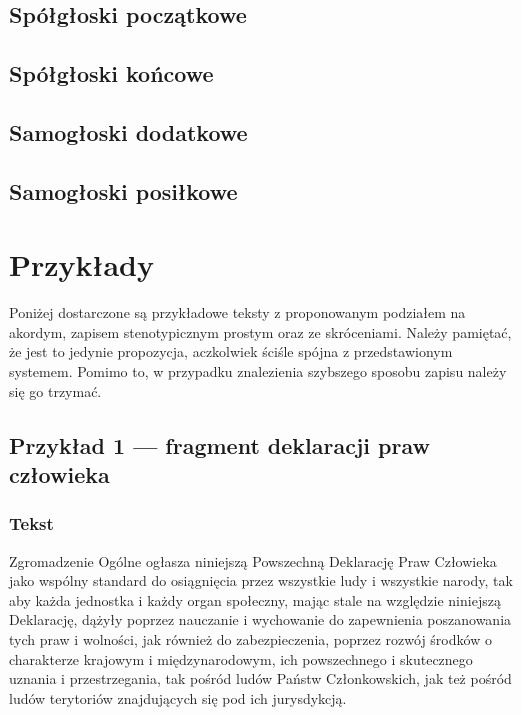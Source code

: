\documentclass[12p, oneside]{book}
\begin{document}
\section{Spółgłoski początkowe}
\label{sec:poczatkowe}

\section{Spółgłoski końcowe}
\label{sec:koncowe}

\section{Samogłoski dodatkowe}
\label{sec:dodatkowe}

\section{Samogłoski posiłkowe}
\label{sec:posilkowe}
\chapter{Przykłady}
Poniżej dostarczone są przykładowe teksty z proponowanym podziałem na akordym, zapisem stenotypicznym prostym oraz ze skróceniami. Należy pamiętać, że jest to jedynie propozycja, aczkolwiek ściśle spójna z przedstawionym systemem. Pomimo to, w przypadku znalezienia szybszego sposobu zapisu należy się go trzymać.
\section{Przykład 1 --- fragment deklaracji praw człowieka}
\subsection{Tekst}

Zgromadzenie Ogólne ogłasza niniejszą Powszechną Deklarację Praw Człowieka jako wspólny standard do osiągnięcia przez wszystkie ludy i wszystkie narody, tak aby każda jednostka i każdy organ społeczny, mając stale na względzie niniejszą Deklarację, dążyły poprzez nauczanie i wychowanie do zapewnienia poszanowania tych praw i wolności, jak również do zabezpieczenia, poprzez rozwój środków o charakterze krajowym i międzynarodowym, ich powszechnego i skutecznego uznania i przestrzegania, tak pośród ludów Państw Członkowskich, jak też pośród ludów terytoriów znajdujących się pod ich jurysdykcją. 
\end{document}
